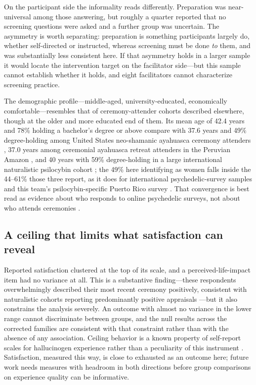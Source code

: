 \documentclass[12pt]{article}
\begin{document}
On the participant side the informality reads differently. Preparation was near-universal among those
answering, but roughly a quarter reported that no screening questions were asked and a further group was
uncertain. The asymmetry is worth separating: preparation is something participants largely do, whether
self-directed or instructed, whereas screening must be done \emph{to} them, and was substantially less
consistent here. If that asymmetry holds in a larger sample it would locate the intervention target on the
facilitator side---but this sample cannot establish whether it holds, and eight facilitators cannot
characterize screening practice.

The demographic profile---middle-aged, university-educated, economically comfortable---resembles that of
ceremony-attender cohorts described elsewhere, though at the older and more educated end of them. Its mean
age of 42.4 years and 78\% holding a bachelor's degree or above compare with 37.6 years and 49\%
degree-holding among United States neo-shamanic ayahuasca ceremony attenders \citep{pagni2025longterm},
37.0 years among ceremonial ayahuasca retreat attenders in the Peruvian Amazon
\citep{ruffell2021ceremonial}, and 40 years with 59\% degree-holding in a large international naturalistic
psilocybin cohort \citep{nayak2023naturalistic}; the 49\% here identifying as women falls inside the
44--61\% those three report, as it does for international psychedelic-survey samples
\citep{kopra2023investigation,robinson2026field} and this team's psilocybin-specific Puerto Rico survey
\citep{velezrodriguez2026psilocybin}. That convergence is best read as evidence about who responds to online
psychedelic surveys, not about who attends ceremonies \citep{bethlehem2010selection}.

\subsection{A ceiling that limits what satisfaction can reveal}

Reported satisfaction clustered at the top of its scale, and a perceived-life-impact item had no variance
at all. This is a substantive finding---these respondents overwhelmingly described their most recent
ceremony positively, consistent with naturalistic cohorts reporting predominantly positive appraisals
\citep{nayak2023naturalistic,ruffell2021ceremonial}---but it also constrains the analysis severely. An
outcome with almost no variance in the lower range cannot discriminate between groups, and the null results
across the corrected families are consistent with that constraint rather than with the absence of any
association. Ceiling behavior is a known property of self-report scales for hallucinogen experience rather
than a peculiarity of this instrument \citep{bouso2016measuring}. Satisfaction, measured this way, is close
to exhausted as an outcome here; future work needs measures with headroom in both directions before group
comparisons on experience quality can be informative.
\end{document}
